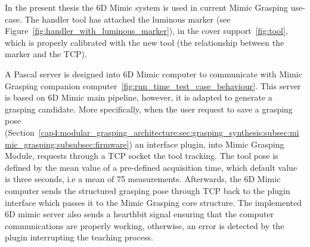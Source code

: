 In the present thesis the 6D Mimic system is used in current Mimic Grasping use-case. The handler tool has attached the luminous marker (see Figure~\ref{fig:handler_with_luminous_marker}),  in the cover support~\ref{fig:tool}, which is properly calibrated with the new tool (the relationship between the marker and the TCP).

\begin{figure}[h!]
\end{figure}

A Pascal server is designed into 6D Mimic computer to communicate with Mimic Grasping companion computer~\ref{fig:run_time_test_case_behaviour}. This server is based on 6D Mimic main pipeline, however, it is adapted to generate a grasping candidate. More specifically, when the user request to save a grasping pose (Section~\ref{cap4:modular_grasping_architecture:sec:grasping_synthesis:subsec:mimic_grasping:subsubsec:firmware}) an interface plugin, into Mimic Grasping Module, requests through a \ac{TCP} socket the tool tracking.  The tool pose is defined by the mean value of a pre-defined acquisition time, which default value is three seconds, i.e a mean of 75 measurements. Afterwards, the 6D Mimic computer sends the structured grasping pose through \ac{TCP} back to the plugin interface which passes it to the Mimic Grasping core structure. The implemented 6D mimic server also sends a hearthbit signal ensuring that the computer communications are properly working, otherwise, an error is detected by the plugin interrupting the teaching process.



